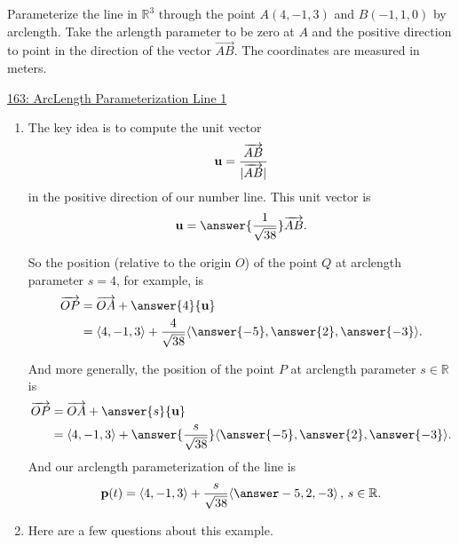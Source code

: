 \documentclass{ximera}
\begin{document}
\begin{question}  \label{Egrett4tt3}
Parameterize the line in $\mathbb{R}^3$ through the point $A(4,-1,3)$ and $B(-1,1,0)$ by arclength. Take the arlength parameter to be zero at $A$ and the positive direction to point in the direction of the vector $\overrightarrow{AB}$. The coordinates are measured in meters.

\begin{onlineOnly}
    \begin{center}
\end{center}
\end{onlineOnly}

\href{https://www.desmos.com/3d/dyxjd322mo}{163: ArcLength Parameterization Line 1}


\begin{explanation}
\begin{enumerate}
\item The key idea is to compute the unit vector 
\[
  {\bf u} = \frac{\overrightarrow{AB}}{|\overrightarrow{AB}|}
\]
in the positive direction of our number line. This unit vector is
\[
   {\bf  u} =   \answer{\frac{1}{\sqrt{38}}} \overrightarrow{AB} .
\]

So the position (relative to the origin $O$) of the point $Q$ at arclength parameter $s=4$, for example, is
\begin{align*}
  \overrightarrow{OP} &= \overrightarrow{OA} + \answer{4}{\bf u} \\
                                &= \langle 4, -1, 3\rangle + \frac{4}{\sqrt{38}} \langle \answer{-5}, \answer{2}, \answer{-3} \rangle .
\end{align*}

And more generally, the position of the point $P$ at arclength parameter $s\in \mathbb{R}$ is
\begin{align*}
   \overrightarrow{OP} &= \overrightarrow{OA} + \answer{s}{\bf u} \\ 
                                 &= \langle 4, -1, 3\rangle + \answer{\frac{s}{\sqrt{38}}} \langle \answer{-5}, \answer{2}, \answer{-3} \rangle .
\end{align*}
And our arclength parameterization of the line is
\[
    {\bf p}(t) =    \langle 4, -1, 3\rangle + \frac{s}{\sqrt{38}} \langle \answer -5, 2, -3 \rangle              \, , \, s\in\mathbb{R}.
\]

\item Here are a few questions about this example.


\end{enumerate}
\end{explanation}
\end{question}
\end{document}
